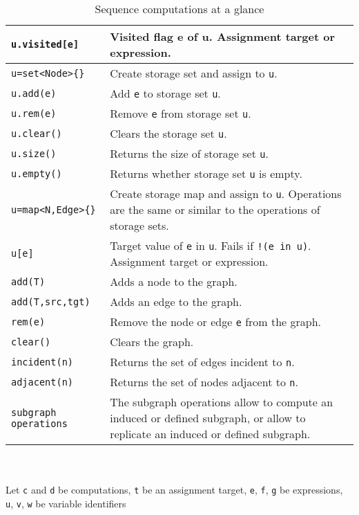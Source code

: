 \begin{table}[htbp]
\begin{minipage}{\linewidth}
\begin{tabularx}{\linewidth}{|lX|}
\texttt{u.visited[e]} & Visited flag e of u. Assignment target or expression.\\
\hline
\texttt{u=set<Node>\{\}}	& Create storage set and assign to \texttt{u}.\\
\texttt{u.add(e)}	& Add \texttt{e} to storage set \texttt{u}.\\
\texttt{u.rem(e)}	& Remove \texttt{e} from storage set \texttt{u}.\\
\texttt{u.clear()}	& Clears the storage set \texttt{u}.\\
\texttt{u.size()}	& Returns the size of storage set \texttt{u}.\\
\texttt{u.empty()} & Returns whether storage set \texttt{u} is empty.\\
\texttt{u=map<N,Edge>\{\}}	& Create storage map and assign to \texttt{u}. Operations are the same or similar to the operations of storage sets.\\
\texttt{u[e]}	& Target value of \texttt{e} in \texttt{u}. Fails if \texttt{!(e in u)}. Assignment target or expression.\\
\hline
\texttt{add(T)}	& Adds a node to the graph.\\
\texttt{add(T,src,tgt)}	& Adds an edge to the graph.\\
\texttt{rem(e)}	& Remove the node or edge \texttt{e} from the graph.\\
\texttt{clear()}	& Clears the graph.\\
\texttt{incident(n)}	& Returns the set of edges incident to \texttt{n}.\\
\texttt{adjacent(n)} & Returns the set of nodes adjacent to \texttt{n}.\\
\texttt{subgraph operations} & The subgraph operations allow to compute an induced or defined subgraph, or allow to replicate an induced or defined subgraph.\\
\hline
\end{tabularx}
\end{minipage}\\
\\ 
{\small Let \texttt{c} and \texttt{d} be computations, \texttt{t} be an assignment target, \texttt{e}, \texttt{f}, \texttt{g} be expressions, \texttt{u}, \texttt{v}, \texttt{w} be variable identifiers }
\caption{Sequence computations at a glance}
\label{comptab}
\end{table}
 

